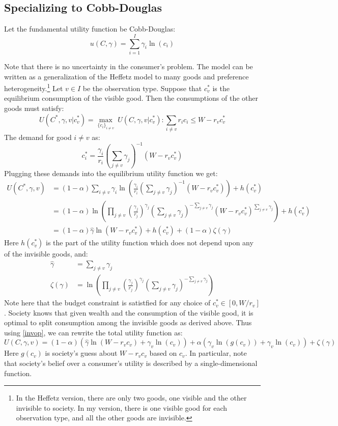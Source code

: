 \documentclass[12pt]{article}
\begin{document}
\subsection{Specializing to Cobb-Douglas}
Let the fundamental utility function be Cobb-Douglas:
\[u(C,\gamma) = \sum_{i=1}^{I} \gamma_i \ln(c_i)\]

Note that there is no uncertainty in the consumer's problem.
The model can be written as a generalization of the Heffetz model to many goods and preference heterogeneity.\footnote{ In the Heffetz version, there are only two goods, one visible and the other invisible to society. In my version, there is one visible good for each observation type, and all the other goods are invisible.}
Let $v\in I$ be the observation type.
Suppose that $c_v^*$ is the equilibrium consumption of the visible good.
Then the consumptions of the other goods must satisfy:
\[ U(C^*,\gamma,v|c_v^*)=\underset{\{c_i\}_{i\neq v}}{\max} \ U(C,\gamma,v|c_v^*) :  \sum_{i \neq v} r_i c_i \le W-r_v c_v^*\]
The demand for good $i\neq v$ as:
\[ c_i^* = \frac{\gamma_i}{r_i}\left(\sum_{j\neq v} \gamma_j\right)^{-1}\left(W-r_v c_v^* \right)\]
Plugging these demands into the equilibrium utility function we get:
\begin{align}
	U(C^*,\gamma,v) &= (1-\alpha)\sum_{i\neq v} \gamma_i \ln\left(\frac{\gamma_i}{r_i}\left(\sum_{j\neq v} \gamma_j\right)^{-1}\left(W-r_v c_v^* \right)\right) + h(c_v^*) \nonumber \\ 
	&= (1-\alpha) \ln\left(\prod_{j\neq v} \left(\frac{\gamma_j}{r_j}\right)^{\gamma_j}\left(\sum_{j\neq v} \gamma_j\right)^{-\sum_{j\neq v} \gamma_j}\left(W-r_v c_v^* \right)^{\sum_{j\neq v} \gamma_j}\right) + h(c_v^*) \nonumber \\ 
	\label{invop}
	&= (1-\alpha) \hat{\gamma} \ln \left(W-r_v c_v^*\right) + h(c_v^*) + (1-\alpha) \zeta(\gamma) 
\end{align}
Here $h(c_v^*)$ is the part of the utility function which does not depend upon any of the invisible goods, and:
\begin{align*}
	\hat{\gamma} &= \sum_{j\neq v} \gamma_j\\
	\zeta(\gamma) & = \ln\left(\prod_{j\neq v} \left(\frac{\gamma_j}{r_j}\right)^{\gamma_j}\left(\sum_{j\neq v} \gamma_j\right)^{-\sum_{j\neq v} \gamma_j}\right) 
\end{align*}
Note here that the budget constraint is satistfied for any choice of $c_v^* \in [0,W/r_v]$.
Society knows that given wealth and the consumption of the visible good, it is optimal to split consumption among the invisible goods as derived above.  Thus using \eqref{invop}, we can rewrite the total utility function as: 
\begin{equation}
	\label{ufun}
	U(C,\gamma,v) = (1-\alpha) \left(\hat{\gamma} \ln \left(W-r_v c_v\right) + \gamma_v \ln \left(c_v \right)\right) + \alpha \left(\gamma_v \ln \left(g(c_v)\right) + \gamma_v \ln \left(c_v\right) \right) + \zeta(\gamma)
	 \end{equation}
Here $g(c_v)$ is society's guess about $W-r_v c_v$ based on $c_v$. 
In particular, note that society's belief over a consumer's utility is described by a single-dimensional function.
\end{document}
